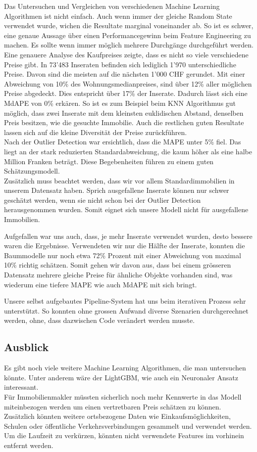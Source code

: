 Das Untersuchen und Vergleichen von verschiedenen Machine Learning Algorithmen ist nicht einfach. Auch wenn immer der gleiche Random State verwendet wurde, wichen die Resultate marginal voneinander ab. So ist es schwer, eine genaue Aussage über einen Performancegewinn beim Feature Engineering zu machen. Es sollte wenn immer möglich mehrere Durchgänge durchgeführt werden.\\
Eine genauere Analyse des Kaufpreises zeigte, dass es nicht so viele verschiedene Preise gibt. In 73'483 Inseraten befinden sich lediglich 1'970 unterschiedliche Preise. Davon sind die meisten auf die nächsten 1'000 CHF gerundet. Mit einer Abweichung von 10\% des Wohnungsmedianpreises, sind über 12\% aller möglichen Preise abgedeckt. Dies entspricht über 17\% der Inserate. Dadurch lässt sich eine MdAPE von 0\% erkären. So ist es zum Beispiel beim KNN Algorithmus gut möglich, dass zwei Inserate mit dem kleinsten euklidischen Abstand, denselben Preis besitzen, wie die gesuchte Immobilie. Auch die restlichen guten Resultate lassen sich auf die kleine Diversität der Preise zurückführen.\\
Nach der Outlier Detection war ersichtlich, dass die MAPE unter 5\% fiel. Das liegt an der stark reduzierten Standardabweichung, die kaum höher als eine halbe Million Franken beträgt. Diese Begebenheiten führen zu einem guten Schätzungsmodell.\\
Zusätzlich muss beachtet werden, dass wir vor allem Standardimmobilien in unserem Datensatz haben. Sprich ausgefallene Inserate können nur schwer geschätzt werden, wenn sie nicht schon bei der Outlier Detection herausgenommen wurden. Somit eignet sich unsere Modell nicht für ausgefallene Immobilien.

Aufgefallen war uns auch, dass, je mehr Inserate verwendet wurden, desto bessere waren die Ergebnisse. Verwendeten wir nur die Hälfte der Inserate, konnten die Baummodelle nur noch etwa 72\% Prozent mit einer Abweichung von maximal 10\% richtig schätzen. Somit gehen wir davon aus, dass bei einem grösseren Datensatz mehrere gleiche Preise für ähnliche Objekte vorhanden sind, was wiederum eine tiefere MAPE wie auch MdAPE mit sich bringt.

Unsere selbst aufgebautes Pipeline-System hat uns beim iterativen Prozess sehr unterstützt. So konnten ohne grossen Aufwand diverse Szenarien durchgerechnet werden, ohne, dass dazwischen Code verändert werden musste.
%	
\subsection{Ausblick} 
Es gibt noch viele weitere Machine Learning Algorithmen, die man untersuchen könnte. Unter anderem wäre der LightGBM, wie auch ein Neuronaler Ansatz interessant.\\ 
Für Immobilienmakler müssten sicherlich noch mehr Kennwerte in das Modell miteinbezogen werden um einen vertretbaren Preis schätzen zu können. Zusätzlich könnten weitere ortsbezogene Daten wie Einkaufsmöglichkeiten, Schulen oder öffentliche Verkehrsverbindungen gesammelt und verwendet werden.\\
Um die Laufzeit zu verkürzen, könnten nicht verwendete Features im vorhinein entfernt werden.
